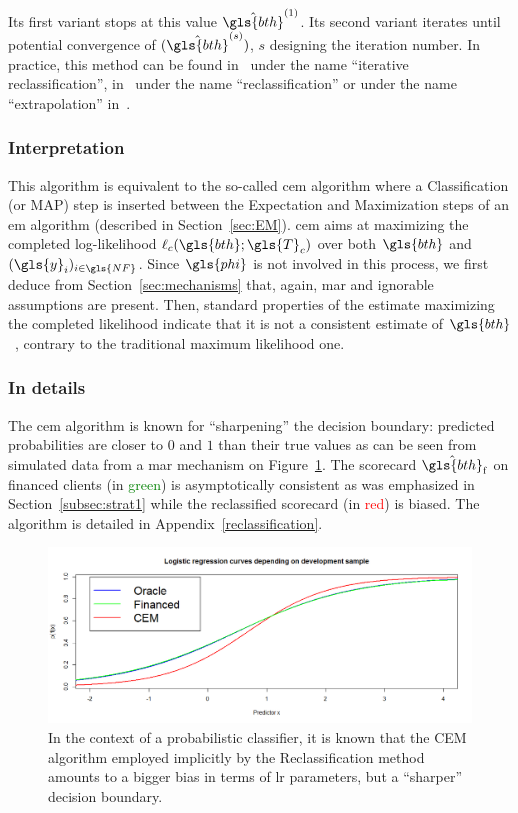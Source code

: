 Its first variant stops at this value $\hat{\gls{bth}}^{(1)}$. Its second variant iterates until potential convergence of $(\hat{\gls{bth}}^{(s)})$, $s$ designing the iteration number. In practice, this method can be found in~\cite{saporta} under the name ``iterative reclassification'', in~\cite{RI6} under the name ``reclassification'' or under the name ``extrapolation'' in~\cite{banasik}.

\subsubsection{Interpretation}
This algorithm is equivalent to the so-called \gls{cem} algorithm where a Classification (or MAP) step is inserted between the Expectation and Maximization steps of an \gls{em} algorithm (described in Section~\ref{sec:EM}).
\gls{cem} aims at maximizing the completed log-likelihood $\ell_c(\gls{bth};\gls{T}_c)$ over both $\gls{bth}$ and $(\gls{y}_i)_{i \in \gls{NF}}$. Since $\gls{phi}$ is not involved in this process, we first deduce from Section~\ref{sec:mechanisms} that, again, \gls{mar} and ignorable assumptions are present. Then, standard properties of the estimate maximizing the completed likelihood indicate that it is not a consistent estimate of $\gls{bth}$~\cite{celeux1992classification}, contrary to the traditional maximum likelihood one.

\subsubsection{In details}
The \gls{cem} algorithm is known for ``sharpening'' the decision boundary: predicted probabilities are closer to $0$ and $1$ than their true values as can be seen from simulated data from a \gls{mar} mechanism on Figure~\ref{fig:biais_CEM}. The scorecard $\hat{\gls{bth}}_{\text{f}}$ on financed clients (in \textcolor{green}{green}) is asymptotically consistent as was emphasized in Section~\ref{subsec:strat1} while the reclassified scorecard (in \textcolor{red}{red}) is biased. The algorithm is detailed in Appendix~\ref{reclassification}.

\begin{figure}[ht]
\center \includegraphics[width=\textwidth]{figures/chapitre2/CEM_bias.png}
\caption{In the context of a probabilistic classifier, it is known that the CEM algorithm employed implicitly by the Reclassification method amounts to a bigger bias in terms of \gls{lr} parameters, but a ``sharper'' decision boundary.}
\label{fig:biais_CEM}
\end{figure}


